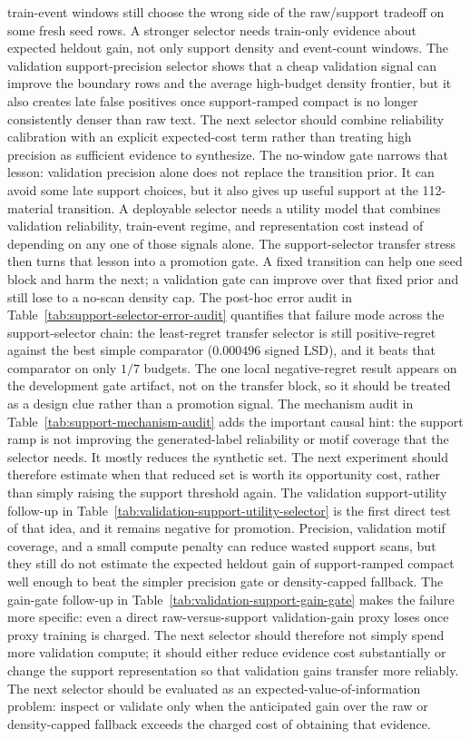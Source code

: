 \documentclass[11pt]{article}
\begin{document}
train-event windows still choose the wrong side of the raw/support tradeoff on
some fresh seed rows. A stronger selector needs train-only evidence about
expected heldout gain, not only support density and event-count windows.
The validation support-precision selector shows that a cheap validation signal
can improve the boundary rows and the average high-budget density frontier, but
it also creates late false positives once support-ramped compact is no longer
consistently denser than raw text. The next selector should combine reliability
calibration with an explicit expected-cost term rather than treating high
precision as sufficient evidence to synthesize.
The no-window gate narrows that lesson: validation precision alone does not
replace the transition prior. It can avoid some late support choices, but it also
gives up useful support at the 112-material transition. A deployable selector
needs a utility model that combines validation reliability, train-event regime,
and representation cost instead of depending on any one of those signals alone.
The support-selector transfer stress then turns that lesson into a promotion
gate. A fixed transition can help one seed block and harm the next; a validation
gate can improve over that fixed prior and still lose to a no-scan density cap.
The post-hoc error audit in Table~\ref{tab:support-selector-error-audit}
quantifies that failure mode across the support-selector chain: the
least-regret transfer selector is still positive-regret against the best simple
comparator (\(0.000496\) signed LSD), and it beats that comparator on only
\(1/7\) budgets. The one local negative-regret result appears on the development
gate artifact, not on the transfer block, so it should be treated as a design
clue rather than a promotion signal.
The mechanism audit in Table~\ref{tab:support-mechanism-audit} adds the
important causal hint: the support ramp is not improving the generated-label
reliability or motif coverage that the selector needs. It mostly reduces the
synthetic set. The next experiment should therefore estimate when that reduced
set is worth its opportunity cost, rather than simply raising the support
threshold again.
The validation support-utility follow-up in
Table~\ref{tab:validation-support-utility-selector} is the first direct test of
that idea, and it remains negative for promotion. Precision, validation motif
coverage, and a small compute penalty can reduce wasted support scans, but they
still do not estimate the expected heldout gain of support-ramped compact well
enough to beat the simpler precision gate or density-capped fallback.
The gain-gate follow-up in Table~\ref{tab:validation-support-gain-gate} makes
the failure more specific: even a direct raw-versus-support validation-gain
proxy loses once proxy training is charged. The next selector should therefore
not simply spend more validation compute; it should either reduce evidence cost
substantially or change the support representation so that validation gains
transfer more reliably.
The next selector should be evaluated as an expected-value-of-information
problem: inspect or validate only when the anticipated gain over the raw or
density-capped fallback exceeds the charged cost of obtaining that evidence.
\end{document}
